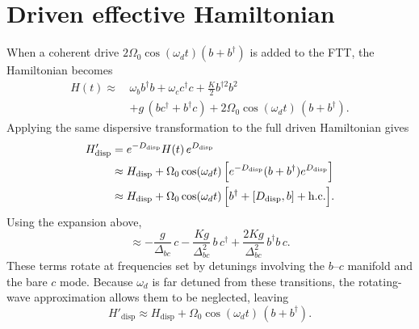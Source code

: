 \section{Driven effective Hamiltonian}

When a coherent drive $2\Omega_0\cos(\omega_d t)(b+b^\dagger)$ is added to the FTT, the Hamiltonian becomes
\begin{equation}
\begin{split}
H(t) \approx\,&
\omega_b b^\dagger b + \omega_c c^\dagger c + \frac{K}{2} b^{\dagger 2} b^2 \\
&+ g\,(bc^\dagger + b^\dagger c)
+ 2\Omega_0 \cos(\omega_d t)\,(b+b^\dagger).
\end{split}
\end{equation}
Applying the same dispersive transformation to the full driven Hamiltonian gives
\begin{align}
H'_{\mathrm{disp}}
&= e^{-D_{\mathrm{disp}}} H(t)\, e^{D_{\mathrm{disp}}}
\nonumber\\
&\approx H_{\mathrm{disp}}
+ \Omega_0 \cos(\omega_d t)\,
\Bigl[e^{-D_{\mathrm{disp}}}(b+b^\dagger)e^{D_{\mathrm{disp}}}\Bigr]
\nonumber\\
&\approx H_{\mathrm{disp}}
+ \Omega_0 \cos(\omega_d t)\,
\Bigl[b^\dagger+[D_{\mathrm{disp}},b]+\mathrm{h.c.}\Bigr].
\end{align}
Using the expansion above,
\begin{equation}
[D_{\mathrm{disp}},b]
\approx
-\frac{g}{\Delta_{bc}}\,c
-\frac{Kg}{\Delta_{bc}^2}\,b\,c^\dagger
+\frac{2Kg}{\Delta_{bc}^2}\,b^\dagger b\,c.
\end{equation}
These terms rotate at frequencies set by detunings involving the $b$--$c$ manifold and the bare $c$ mode. Because $\omega_d$ is far detuned from these transitions, the rotating-wave approximation allows them to be neglected, leaving
\begin{equation}
H'_{\mathrm{disp}} \approx H_{\mathrm{disp}} + \Omega_0 \cos(\omega_d t)\,(b+b^\dagger).
\end{equation}

